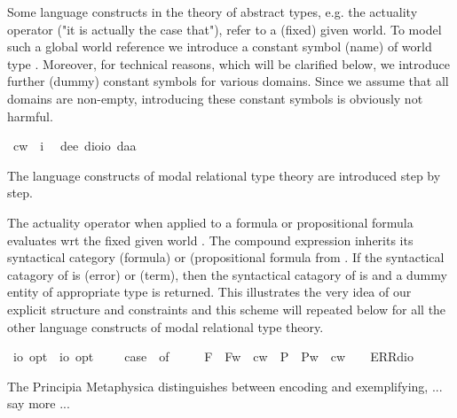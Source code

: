 \begin{isabellebody}
\begin{isamarkuptext}%
Some language constructs in the theory of abstract types, e.g. the actuality operator  
 \isa{{\isasymA}} ("it is actually the case that"), refer to a (fixed) given world. To model such a 
 global world reference we introduce a
 constant symbol (name)  of world type . Moreover, for technical reasons, 
 which will be clarified below, we introduce further (dummy) constant symbols for various domains. Since
 we assume that all domains are non-empty, introducing these constant symbols is obviously not harmful.%
\end{isamarkuptext}%
\isamarkuptrue%
\isamarkupfalse%
\ cw\ {\isacharcolon}{\isacharcolon}\ i\ \isanewline
{}\isamarkupfalse%
\ de{\isacharcolon}{\isacharcolon}{\isachardoublequoteopen}e{\isachardoublequoteclose}\ dio{\isacharcolon}{\isacharcolon}{\isachardoublequoteopen}io{\isachardoublequoteclose}\ da{\isacharcolon}{\isacharcolon}{\isacharprime}a%
\isamarkuptrue%
%
\begin{isamarkuptext}%
The language constructs of modal relational type theory are introduced step by step.%
\end{isamarkuptext}%
\isamarkuptrue%
%
\begin{isamarkuptext}%
The actuality operator \isa{{\isasymA}} when applied to a formula or propositional formula 
 \isa{{\isasymphi}} evaluates \isa{{\isasymphi}} wrt the fixed given world . 
 The compound expression \isa{{\isasymA}\ {\isasymphi}} inherits its syntactical category   (formula) or
  (propositional formula from \isa{{\isasymphi}}. If the syntactical catagory of  \isa{{\isasymphi}} is 
  (error) or  (term), then the syntactical catagory of \isa{{\isasymA}\ {\isasymphi}} 
 is  and a dummy entity of appropriate type is returned. This illustrates the very 
 idea of our explicit structure and constraints and this scheme will repeated below
 for all the other language constructs of modal relational type theory.%
\end{isamarkuptext}%
\isamarkuptrue%
\isamarkupfalse%
\ {\isasymA}{\isacharcolon}{\isacharcolon}{\isachardoublequoteopen}io\ opt\ {\isasymRightarrow}\ io\ opt{\isachardoublequoteclose}\ \ {\isachardoublequoteopen}{\isasymA}\ {\isasymphi}\ {\isasymequiv}\ case\ {\isasymphi}\ of\ \isanewline
\ \ \ \ F{\isacharparenleft}{\isasympsi}{\isacharparenright}\ {\isasymRightarrow}\ F{\isacharparenleft}{\isasymlambda}w{\isachardot}\ {\isasympsi}\ cw{\isacharparenright}\ {\isacharbar}\ P{\isacharparenleft}{\isasympsi}{\isacharparenright}\ {\isasymRightarrow}\ P{\isacharparenleft}{\isasymlambda}w{\isachardot}\ {\isasympsi}\ cw{\isacharparenright}\ {\isacharbar}\ {\isacharunderscore}\ {\isasymRightarrow}\ ERR{\isacharparenleft}dio{\isacharparenright}{\isachardoublequoteclose}%
\begin{isamarkuptext}%
The Principia Metaphysica distinguishes between encoding and exemplifying, ... say more ...


\end{isamarkuptext}
\end{isabellebody}
